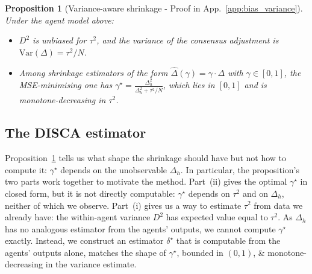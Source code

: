 \documentclass{article}
\newtheorem{proposition}{Proposition}
\begin{document}
\begin{proposition}[Variance-aware shrinkage - Proof in App.~\ref{app:bias_variance}]
\label{prop:shrinkage}
Under the agent model above:
\begin{itemize}
    \item[\textup{(i)}] $D^2$ is unbiased for $\tau^2$, and the 
    variance of the consensus adjustment is 
    $\mathrm{Var}(\Delta) = \tau^2 / N$.
    \item[\textup{(ii)}] Among shrinkage estimators of the form 
    $\hat{\Delta}(\gamma) = \gamma \cdot \Delta$ with 
    $\gamma \in [0, 1]$, the MSE-minimising one has
    $\gamma^\star = \frac{\Delta_h^2}{\Delta_h^2 + \tau^2 / N}$,
    which lies in $[0, 1]$ and is monotone-decreasing in $\tau^2$.
\end{itemize}
\end{proposition}


\vspace{-0.3cm}
\subsection{The DISCA estimator}
\label{sec:method:estimator}


Proposition~\ref{prop:shrinkage} tells us what shape the shrinkage 
should have but not how to compute it: $\gamma^\star$ depends on 
the unobservable $\Delta_h$. 
In particular, the proposition's two parts work together to motivate the method. Part~(ii) gives the optimal 
$\gamma^\star$ in closed form, but it is not directly computable: 
$\gamma^\star$ depends on $\tau^2$ and on $\Delta_h$, neither of 
which we observe. Part~(i) gives us a way to estimate $\tau^2$ 
from data we already have: the within-agent variance $D^2$ has expected 
value equal to $\tau^2$. As $\Delta_h$ has no analogous estimator from the agents' outputs, we cannot compute $\gamma^\star$ exactly. 
%
Instead, we construct an estimator 
$\delta^\star$ that is computable from the agents' outputs 
alone, matches the shape of $\gamma^\star$, bounded in $(0,1)$, \& monotone-decreasing in the variance estimate.
\end{document}
